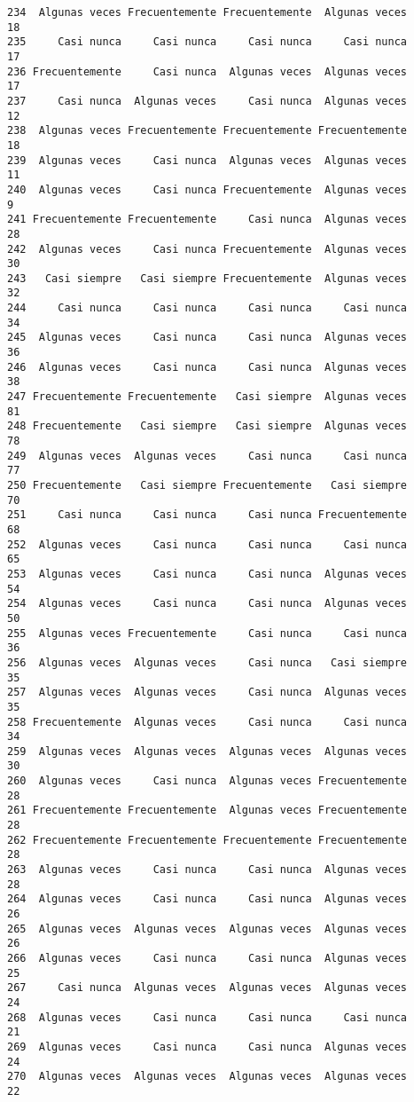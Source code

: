 \documentclass[
  letterpaper,
  DIV=11,
  numbers=noendperiod]{scrartcl}
\begin{document}
\begin{verbatim}
234  Algunas veces Frecuentemente Frecuentemente  Algunas veces      18
235     Casi nunca     Casi nunca     Casi nunca     Casi nunca      17
236 Frecuentemente     Casi nunca  Algunas veces  Algunas veces      17
237     Casi nunca  Algunas veces     Casi nunca  Algunas veces      12
238  Algunas veces Frecuentemente Frecuentemente Frecuentemente      18
239  Algunas veces     Casi nunca  Algunas veces  Algunas veces      11
240  Algunas veces     Casi nunca Frecuentemente  Algunas veces       9
241 Frecuentemente Frecuentemente     Casi nunca  Algunas veces      28
242  Algunas veces     Casi nunca Frecuentemente  Algunas veces      30
243   Casi siempre   Casi siempre Frecuentemente  Algunas veces      32
244     Casi nunca     Casi nunca     Casi nunca     Casi nunca      34
245  Algunas veces     Casi nunca     Casi nunca  Algunas veces      36
246  Algunas veces     Casi nunca     Casi nunca  Algunas veces      38
247 Frecuentemente Frecuentemente   Casi siempre  Algunas veces      81
248 Frecuentemente   Casi siempre   Casi siempre  Algunas veces      78
249  Algunas veces  Algunas veces     Casi nunca     Casi nunca      77
250 Frecuentemente   Casi siempre Frecuentemente   Casi siempre      70
251     Casi nunca     Casi nunca     Casi nunca Frecuentemente      68
252  Algunas veces     Casi nunca     Casi nunca     Casi nunca      65
253  Algunas veces     Casi nunca     Casi nunca  Algunas veces      54
254  Algunas veces     Casi nunca     Casi nunca  Algunas veces      50
255  Algunas veces Frecuentemente     Casi nunca     Casi nunca      36
256  Algunas veces  Algunas veces     Casi nunca   Casi siempre      35
257  Algunas veces  Algunas veces     Casi nunca  Algunas veces      35
258 Frecuentemente  Algunas veces     Casi nunca     Casi nunca      34
259  Algunas veces  Algunas veces  Algunas veces  Algunas veces      30
260  Algunas veces     Casi nunca  Algunas veces Frecuentemente      28
261 Frecuentemente Frecuentemente  Algunas veces Frecuentemente      28
262 Frecuentemente Frecuentemente Frecuentemente Frecuentemente      28
263  Algunas veces     Casi nunca     Casi nunca  Algunas veces      28
264  Algunas veces     Casi nunca     Casi nunca  Algunas veces      26
265  Algunas veces  Algunas veces  Algunas veces  Algunas veces      26
266  Algunas veces     Casi nunca     Casi nunca  Algunas veces      25
267     Casi nunca  Algunas veces  Algunas veces  Algunas veces      24
268  Algunas veces     Casi nunca     Casi nunca     Casi nunca      21
269  Algunas veces     Casi nunca     Casi nunca  Algunas veces      24
270  Algunas veces  Algunas veces  Algunas veces  Algunas veces      22

\end{verbatim}
\end{document}
